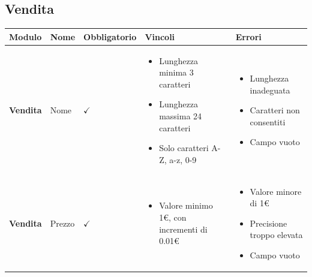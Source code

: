 \documentclass[12pt]{article}
\begin{document}
 \subsection{Vendita}
 \setlength\LTleft{0pt}
 \setlength\LTright{0pt}
 \begin{longtable}{|l|l|l|l|l|}
 \hline
 Modulo & Nome & Obbligatorio & Vincoli & Errori\\\hline
 \endhead
 \hline
 \textbf{Vendita} & Nome & $\checkmark$ & \begin{minipage}{3.5cm}
 \vspace{5pt}
 \begin{itemize}
 \item Lunghezza minima 3 caratteri
 \item Lunghezza massima 24 caratteri
 \item Solo caratteri A-Z, a-z, 0-9
 \end{itemize}
 \vspace{5pt}
 \end{minipage} & \begin{minipage}{4cm}
 \vspace{5pt}
 \begin{itemize}
 \item Lunghezza inadeguata
 \item Caratteri non consentiti
 \item Campo vuoto
 \end{itemize}
 \vspace{5pt}
 \end{minipage} \\ \hline
 
 \textbf{Vendita} & Prezzo & $\checkmark$ & \begin{minipage}{3.5cm}
 \vspace{5pt}
 \begin{itemize}
 \item Valore minimo 1€, con incrementi di 0.01€
 \end{itemize}
 \vspace{5pt}
 \end{minipage} & \begin{minipage}{4cm}
 \vspace{5pt}
 \begin{itemize}
 \item Valore minore di 1€
 \item Precisione troppo elevata
 \item Campo vuoto
 \end{itemize}
 \vspace{5pt}
 \end{minipage} \\ \hline
 

\end{longtable}
\end{document}
